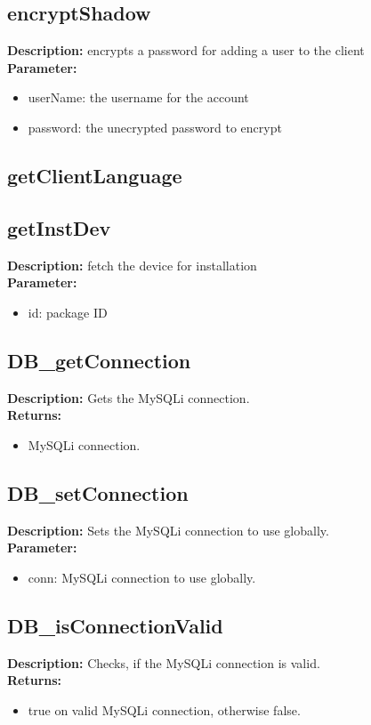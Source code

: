 \subsection{encryptShadow}
\textbf{Description:} encrypts a password for adding a user to the client\\
\textbf{Parameter:}
\begin{itemize}
\item userName: the username for the account
\item password: the unecrypted password to encrypt
\end{itemize}

\subsection{getClientLanguage}

\subsection{getInstDev}
\textbf{Description:} fetch the device for installation\\
\textbf{Parameter:}
\begin{itemize}
\item id: package ID
\end{itemize}

\subsection{DB\_getConnection}
\textbf{Description:} Gets the MySQLi connection.\\
\textbf{Returns:}
\begin{itemize}
\item MySQLi connection.
\end{itemize}

\subsection{DB\_setConnection}
\textbf{Description:} Sets the MySQLi connection to use globally.\\
\textbf{Parameter:}
\begin{itemize}
\item conn: MySQLi connection to use globally.
\end{itemize}

\subsection{DB\_isConnectionValid}
\textbf{Description:} Checks, if the MySQLi connection is valid.\\
\textbf{Returns:}
\begin{itemize}
\item true on valid MySQLi connection, otherwise false.
\end{itemize}

